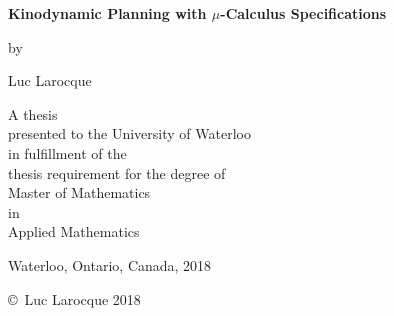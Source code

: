 \pagestyle{empty}

\begin{titlepage}
        \begin{center}
        \vspace*{1.0cm}

        \Huge
        {\bf Kinodynamic Planning with $\mu$-Calculus Specifications}

        \vspace*{1.0cm}

        \normalsize
        by \\

        \vspace*{1.0cm}

        \Large
        Luc Larocque \\

        \vspace*{3.0cm}

        \normalsize
        A thesis \\
        presented to the University of Waterloo \\ 
        in fulfillment of the \\
        thesis requirement for the degree of \\
        Master of Mathematics \\
        in \\
        Applied Mathematics \\

        \vspace*{2.0cm}

        Waterloo, Ontario, Canada, 2018 \\

        \vspace*{1.0cm}

        \copyright\ Luc Larocque 2018 \\
        \end{center}
\end{titlepage}

\pagestyle{plain}
\setcounter{page}{2}

